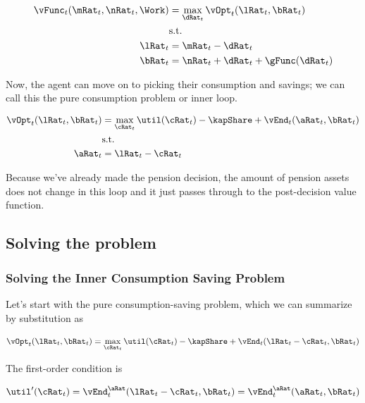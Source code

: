 \documentclass{article}
\begin{document}
\begin{equation}
\begin{split}
        \vFunc_{t}(\mRat_{t}, \nRat_{t}, \Work) & = \max_{\dRat_{t}}
        \vOpt_{t}(\lRat_{t}, \bRat_{t}) \\
        & \text{s.t.} \\
        \lRat_{t} & = \mRat_{t} - \dRat_{t} \\
        \bRat_{t} & = \nRat_{t} + \dRat_{t} + \gFunc(\dRat_{t})
    \end{split}
\end{equation}

Now, the agent can move on to picking their consumption and savings; we can call this the pure consumption problem or inner loop.

\begin{equation}
\begin{split}
        \vOpt_{t}(\lRat_{t}, \bRat_{t}) & = \max_{\cRat_{t}}
        \util(\cRat_{t}) - \kapShare + \vEnd_{t}(\aRat_{t}, \bRat_{t}) \\
        & \text{s.t.} \\
        \aRat_{t} & = \lRat_{t} - \cRat_{t} \\
    \end{split}
\end{equation}

Because we've already made the pension decision, the amount of pension assets does not change in this loop and it just passes through to the post-decision value function.

\subsection{Solving the problem}

\subsubsection{Solving the Inner Consumption Saving Problem}

Let's start with the pure consumption-saving problem, which we can summarize by substitution as

\begin{equation}
\vOpt_{t}(\lRat_{t}, \bRat_{t}) = \max_{\cRat_{t}} \util(\cRat_{t}) - \kapShare +
    \vEnd_{t}(\lRat_{t} - \cRat_{t}, \bRat_{t})
\end{equation}

The first-order condition is

\begin{equation}
\util'(\cRat_{t}) = \vEnd_{t}^{\aRat}(\lRat_{t}-\cRat_{t}, \bRat_{t}) =
    \vEnd_{t}^{\aRat}(\aRat_{t}, \bRat_{t})
\end{equation}
\end{document}
